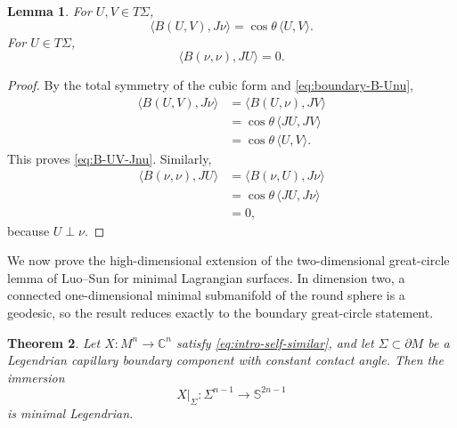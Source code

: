 \documentclass[11pt,a4paper]{article}
\numberwithin{equation}{section}
\newtheorem{theorem}{Theorem}[section]
\newtheorem{lemma}[theorem]{Lemma}
\newcommand{\C}{\mathbb C}
\newcommand{\Sph}{\mathbb S}
\begin{document}
\begin{lemma}
For $U,V\in T\Sigma$,
\begin{equation}\label{eq:B-UV-Jnu}
        \langle B(U,V),J\nu\rangle
        =\cos\theta\,\langle U,V\rangle.
\end{equation}
For $U\in T\Sigma$,
\begin{equation}\label{eq:B-nunu-JU}
        \langle B(\nu,\nu),JU\rangle=0.
\end{equation}
\end{lemma}

\begin{proof}
By the total symmetry of the cubic form and \eqref{eq:boundary-B-Unu},
$$
\begin{aligned}
        \langle B(U,V),J\nu\rangle
        &=\langle B(U,\nu),JV\rangle\\
        &=\cos\theta\,\langle JU,JV\rangle\\
        &=\cos\theta\,\langle U,V\rangle.
\end{aligned}
$$
This proves \eqref{eq:B-UV-Jnu}.  Similarly,
$$
\begin{aligned}
        \langle B(\nu,\nu),JU\rangle
        &=\langle B(\nu,U),J\nu\rangle\\
        &=\cos\theta\,\langle JU,J\nu\rangle
        \\&=0,
\end{aligned}
$$
because $U\perp\nu$.
\end{proof}


We now prove the high-dimensional extension of the two-dimensional great-circle lemma of Luo--Sun \cite{LuoSun2021} for minimal Lagrangian surfaces.  In dimension two, a connected one-dimensional minimal submanifold of the round sphere is a geodesic, so the result reduces exactly to the boundary great-circle statement.

\begin{theorem}\label{thm:boundary-minimal}
Let $X:M^n\to\C^n$ satisfy \eqref{eq:intro-self-similar}, and let $\Sigma\subset\partial M$ be a Legendrian capillary boundary component with constant contact angle.  Then the immersion
$$
        X|_\Sigma:\Sigma^{n-1}\longrightarrow\Sph^{2n-1}
$$
is minimal Legendrian.
\end{theorem}
\end{document}
